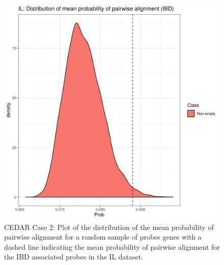 \documentclass[12pt]{article} %
\begin{document}
	
	\begin{figure}[h]
		\centering
		\includegraphics[scale=0.75]{Images/Biology_data/Set_1000/All_datasets/Mean_alignment_probability/IL_KEGG_INFLAMMATORY_BOWEL_DISEASE.png}
		\caption{CEDAR Case 2: Plot of the distribution of the mean probability of pairwise alignment for a random sample of probes genes with a dashed line indicating the mean probability of pairwise alignment for the IBD associated probes in the IL dataset.}
		\label{fig:results:cedar_2:mdi_il_ibd_alignment_prob_distn}
	\end{figure}
	
\end{document}
